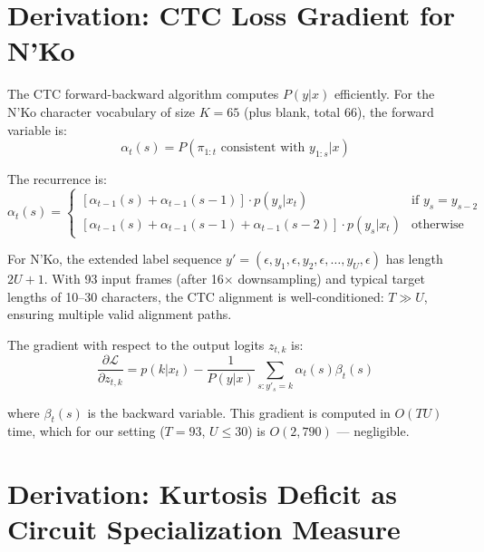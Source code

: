 \documentclass[11pt]{article}
\theoremstyle{remark}
\begin{document}
\section{Derivation: CTC Loss Gradient for N'Ko}

The CTC forward-backward algorithm computes $P(y | x)$ efficiently. For the N'Ko character vocabulary of size $K = 65$ (plus blank, total 66), the forward variable is:
\begin{equation}
\alpha_t(s) = P(\pi_{1:t} \text{ consistent with } y_{1:s} | x)
\end{equation}

The recurrence is:
\begin{equation}
\alpha_t(s) = \begin{cases}
\left[\alpha_{t-1}(s) + \alpha_{t-1}(s-1)\right] \cdot p(y_s | x_t) & \text{if } y_s = y_{s-2} \\
\left[\alpha_{t-1}(s) + \alpha_{t-1}(s-1) + \alpha_{t-1}(s-2)\right] \cdot p(y_s | x_t) & \text{otherwise}
\end{cases}
\end{equation}

For N'Ko, the extended label sequence $y' = (\epsilon, y_1, \epsilon, y_2, \epsilon, \ldots, y_U, \epsilon)$ has length $2U + 1$. With 93 input frames (after 16$\times$ downsampling) and typical target lengths of 10--30 characters, the CTC alignment is well-conditioned: $T \gg U$, ensuring multiple valid alignment paths.

The gradient with respect to the output logits $z_{t,k}$ is:
\begin{equation}
\frac{\partial \mathcal{L}}{\partial z_{t,k}} = p(k | x_t) - \frac{1}{P(y|x)} \sum_{s: y'_s = k} \alpha_t(s) \beta_t(s)
\end{equation}

where $\beta_t(s)$ is the backward variable. This gradient is computed in $O(TU)$ time, which for our setting ($T = 93$, $U \leq 30$) is $O(2{,}790)$ --- negligible.

\section{Derivation: Kurtosis Deficit as Circuit Specialization Measure}
\end{document}
